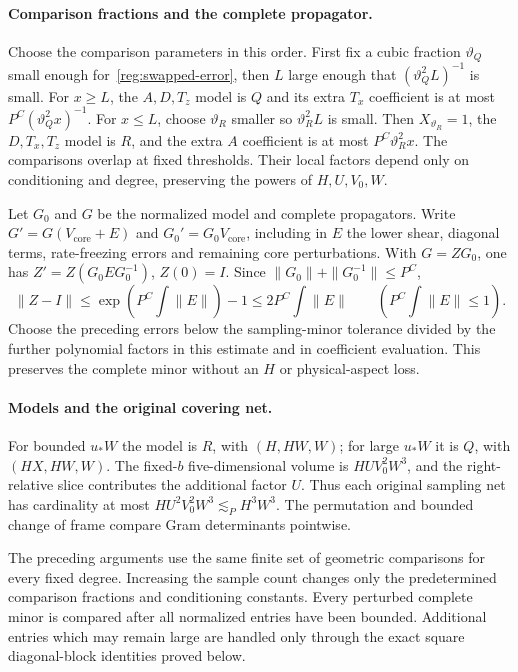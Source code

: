 \documentclass[11pt]{amsart}
\theoremstyle{definition}
\theoremstyle{remark}
\numberwithin{equation}{section}
\begin{document}
\paragraph{Comparison fractions and the complete propagator.}
Choose the comparison parameters in this order. First fix a cubic fraction $\vartheta_Q$ small enough for~\eqref{reg:swapped-error}, then $L$ large enough that $(\vartheta_Q^2L)^{-1}$ is small. For $x\ge L$, the $A,D,T_z$ model is $Q$ and its extra $T_x$ coefficient is at most $P^C(\vartheta_Q^2x)^{-1}$. For $x\le L$, choose $\vartheta_R$ smaller so $\vartheta_R^2L$ is small. Then $X_{\vartheta_R}=1$, the $D,T_x,T_z$ model is $R$, and the extra $A$ coefficient is at most $P^C\vartheta_R^2x$. The comparisons overlap at fixed thresholds. Their local factors depend only on conditioning and degree, preserving the powers of $H,U,V_0,W$.

Let $G_0$ and $G$ be the normalized model and complete propagators. Write $G'=G(V_{\mathrm{core}}+E)$ and $G_0'=G_0V_{\mathrm{core}}$, including in $E$ the lower shear, diagonal terms, rate-freezing errors and remaining core perturbations. With $G=ZG_0$, one has $Z'=Z(G_0EG_0^{-1})$, $Z(0)=I$. Since $\|G_0\|+\|G_0^{-1}\|\le P^C$,
\[
 \|Z-I\|\le\exp\left(P^C\int\|E\|\right)-1
 \le 2P^C\int\|E\|\qquad\left(P^C\int\|E\|\le1\right).
\]
Choose the preceding errors below the sampling-minor tolerance divided by the further polynomial factors in this estimate and in coefficient evaluation. This preserves the complete minor without an $H$ or physical-aspect loss.

\paragraph{Models and the original covering net.}
For bounded $u_*W$ the model is $R$, with $(H,HW,W)$; for large $u_*W$ it is $Q$, with $(HX,HW,W)$. The fixed-$b$ five-dimensional volume is $HUV_0^2W^3$, and the right-relative slice contributes the additional factor $U$. Thus each original sampling net has cardinality at most $HU^2V_0^2W^3\lesssim_PH^3W^3$. The permutation and bounded change of frame compare Gram determinants pointwise.

The preceding arguments use the same finite set of geometric comparisons for every fixed degree. Increasing the sample count changes only the predetermined comparison fractions and conditioning constants. Every perturbed complete minor is compared after all normalized entries have been bounded. Additional entries which may remain large are handled only through the exact square diagonal-block identities proved below.
\end{document}
